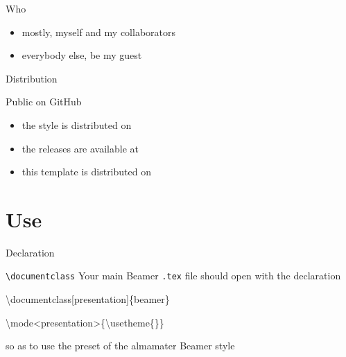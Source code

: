 \documentclass[presentation,\almamaterseal,apice]{beamer}\mode<presentation>{\usetheme{\almamaterpreset}}
\begin{document}




\begin{frame}[c]{Who}
%
\begin{itemize}
	\item mostly, myself and my collaborators
	\item everybody else, be my guest
\end{itemize}
%
\end{frame}

\begin{frame}[c]{Distribution}
%
\begin{block}{Public on GitHub}
	\begin{itemize}
		\item the style is distributed on 
		\item the releases are available at 
		\item this template is distributed on 
	\end{itemize}
\end{block}
%
\end{frame}

\section{Use}

\begin{frame}[c,fragile]{Declaration}
%
\begin{block}{\texttt{\textbackslash{}documentclass}}
Your main Beamer \texttt{.tex} file should open with the declaration
%
\par\smallskip
{\ttfamily\hspace*{2em}\textbackslash documentclass[presentation]\{beamer\}\par
\hspace*{4em}\textbackslash mode<presentation>\{\textbackslash usetheme\{\almamaterpreset\}\}\par}
\smallskip
%
so as to use the \almamaterpreset{} preset of the almamater Beamer style
\end{block}
%
\end{frame}
\end{document}
